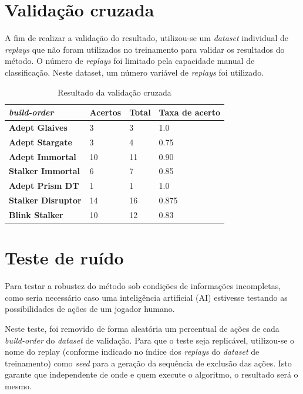 		\section{Validação cruzada}
A fim de realizar a validação do resultado, utilizou-se um \textit{dataset} individual de \textit{\glspl{replay}} que não foram utilizados no treinamento para validar os resultados do método. O número de \textit{\glspl{replay}} foi limitado pela capacidade manual de classificação. Neste dataset, um número variável de \textit{\glspl{replay}} foi utilizado.

\begin{table}[H]
\centering
\caption{Resultado da validação cruzada}
\label{tab:resultados-cruzada}
\begin{tabular}{l|l|l|l}
	\textit{\Gls{build-order}} 		& Acertos 	& Total & Taxa de acerto 	\\ \hline
	\textbf{Adept Glaives} 		& 3  		& 3  	& 1.0				\\
	\textbf{Adept Stargate} 		& 3  		& 4 		& 0.75				\\
	\textbf{Adept Immortal} 		& 10 		& 11 	& 0.90				\\
	\textbf{Stalker Immortal} 	& 6  		& 7  	& 0.85				\\
	\textbf{Adept Prism DT} 		& 1  		& 1  	& 1.0				\\
	\textbf{Stalker Disruptor} 	& 14  		& 16  	& 0.875				\\
	\textbf{Blink Stalker}	 	& 10  		& 12  	& 0.83	
\end{tabular}
\end{table}

		\section{Teste de ruído}
Para testar a robustez do método sob condições de informações incompletas, como seria necessário caso uma inteligência artificial (AI) estivesse testando as possibilidades de ações de um jogador humano.

Neste teste, foi removido de forma aleatória um percentual de ações de cada \textit{\gls{build-order}} do \textit{dataset} de validação. Para que o teste seja replicável, utilizou-se o nome do \gls{replay} (conforme indicado no índice dos \textit{\glspl{replay}} do \textit{dataset} de treinamento) como \textit{seed} para a geração da sequência de exclusão das ações. Isto garante que independente de onde e quem execute o algoritmo, o resultado será o mesmo.

